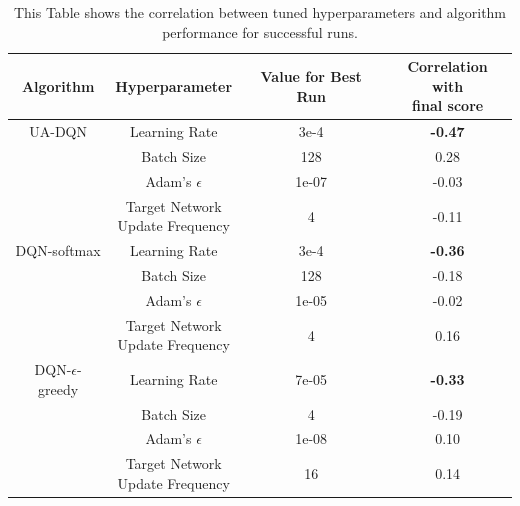 \begin{table}[h]
  \centering
  \caption{This Table shows the correlation between tuned hyperparameters and algorithm performance for successful runs.}
  \label{tab:hyperparameters}
  \begin{tabular}{c||c|c|c}
    Algorithm & Hyperparameter & Value for Best Run & \makecell{Correlation with \\ final score} \\ \hline
    UA-DQN & Learning Rate                                & 3e-4 & \bf{-0.47}\\
           & Batch Size                                   & 128 &  0.28\\
           & Adam's $\epsilon$                            & 1e-07 & -0.03\\
           & \makecell{Target Network \\ Update Frequency}& 4 & -0.11\\ \hline
    DQN-softmax & Learning Rate                                 & 3e-4 & \bf{-0.36} \\
                & Batch Size                                    & 128 & -0.18\\
                & Adam's $\epsilon$                             & 1e-05 & -0.02\\
                & \makecell{Target Network \\ Update Frequency} & 4 &  0.16\\ \hline
    DQN-$\epsilon$-greedy & Learning Rate                       & 7e-05 & \bf{-0.33}\\
                & Batch Size                                    & 4 & -0.19\\
                & Adam's $\epsilon$                             & 1e-08 &  0.10\\
                & \makecell{Target Network \\ Update Frequency} & 16 &  0.14

  \end{tabular}
\end{table}




